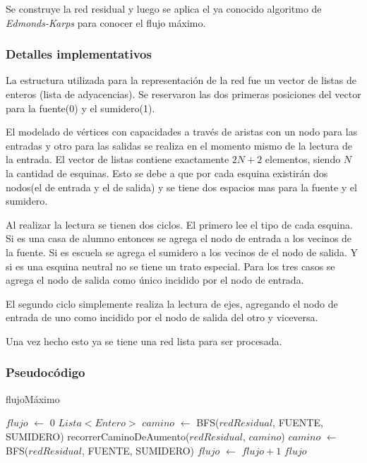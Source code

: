 Se construye la red residual y luego se aplica el ya conocido algoritmo de
\textit{Edmonds-Karps} para conocer el flujo máximo.

\subsubsection*{Detalles implementativos}

La estructura utilizada para la representación de la red fue un vector de
listas de enteros (lista de adyacencias). Se reservaron las dos primeras
posiciones del vector para la fuente(0) y el sumidero(1).

El modelado de vértices con capacidades a través de aristas con un nodo para
las entradas y otro para las salidas se realiza en el momento mismo de la
lectura de la entrada. El vector de listas contiene exactamente $2N + 2$
elementos, siendo $N$ la cantidad de esquinas. Esto se debe a que por cada
esquina existirán dos nodos(el de entrada y el de salida) y se tiene dos
espacios mas para la fuente y el sumidero.

Al realizar la lectura se tienen dos ciclos. El primero lee el tipo de cada
esquina. Si es una casa de alumno entonces se agrega el nodo de entrada a los
vecinos de la fuente. Si es escuela se agrega el sumidero a los vecinos de el
nodo de salida. Y si es una esquina neutral no se tiene un trato especial.
Para los tres casos se agrega el nodo de salida como único incidido por el
nodo de entrada.

El segundo ciclo simplemente realiza la lectura de ejes, agregando el nodo de
entrada de uno como incidido por el nodo de salida del otro y viceversa.

Una vez hecho esto ya se tiene una red lista para ser procesada.

\subsubsection*{Pseudocódigo}


\begin{algorithm}[]
	\caption{flujoMáximo}

	$flujo$ $\gets$ 0 \;
	$Lista<Entero>$ $camino$ $\gets$ BFS($redResidual$, FUENTE, SUMIDERO) \;
	 {
		recorrerCaminoDeAumento($redResidual$, $camino$) \;
		$camino$ $\gets$ BFS($redResidual$, FUENTE, SUMIDERO) \;
		$flujo$ $\gets$ $flujo + 1$ \;
	}
	\Return $flujo$ \;
\end{algorithm}

